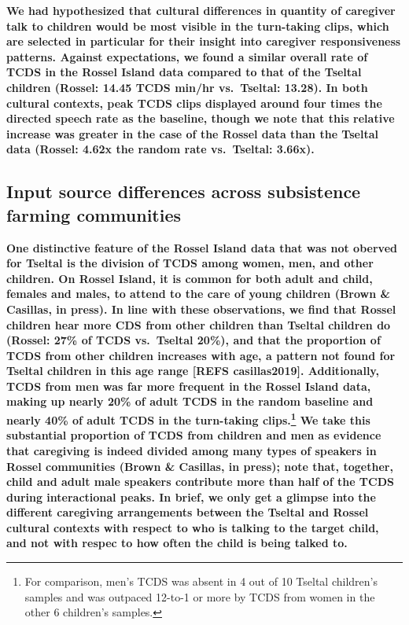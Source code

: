 \documentclass[,man,floatsintext]{apa6}
\let\rmarkdownfootnote\footnote%
\def\footnote{\protect\rmarkdownfootnote}
\begin{document}
\textbf{We had hypothesized that cultural differences in quantity of
caregiver talk to children would be most visible in the turn-taking
clips, which are selected in particular for their insight into caregiver
responsiveness patterns. Against expectations, we found a similar
overall rate of TCDS in the Rossel Island data compared to that of the
Tseltal children (Rossel: 14.45 TCDS min/hr vs.~Tseltal: 13.28). In both
cultural contexts, peak TCDS clips displayed around four times the
directed speech rate as the baseline, though we note that this relative
increase was greater in the case of the Rossel data than the Tseltal
data (Rossel: 4.62x the random rate vs.~Tseltal: 3.66x).}

\subsection{\texorpdfstring{\textbf{Input source differences across
subsistence farming
communities}}{Input source differences across subsistence farming communities}}\label{input-source-differences-across-subsistence-farming-communities}

\textbf{One distinctive feature of the Rossel Island data that was not
oberved for Tseltal is the division of TCDS among women, men, and other
children. On Rossel Island, it is common for both adult and child,
females and males, to attend to the care of young children (Brown \&
Casillas, in press). In line with these observations, we find that
Rossel children hear more CDS from other children than Tseltal children
do (Rossel: 27\% of TCDS vs.~Tseltal 20\%), and that the proportion of
TCDS from other children increases with age, a pattern not found for
Tseltal children in this age range {[}REFS casillas2019{]}.
Additionally, TCDS from men was far more frequent in the Rossel Island
data, making up nearly 20\% of adult TCDS in the random baseline and
nearly 40\% of adult TCDS in the turn-taking clips.\footnote{For
  comparison, men's TCDS was absent in 4 out of 10 Tseltal children's
  samples and was outpaced 12-to-1 or more by TCDS from women in the
  other 6 children's samples.} We take this substantial proportion of
TCDS from children and men as evidence that caregiving is indeed divided
among many types of speakers in Rossel communities (Brown \& Casillas,
in press); note that, together, child and adult male speakers contribute
more than half of the TCDS during interactional peaks. In brief, we only
get a glimpse into the different caregiving arrangements between the
Tseltal and Rossel cultural contexts with respect to who is talking to
the target child, and not with respec to how often the child is being
talked to.}
\end{document}

